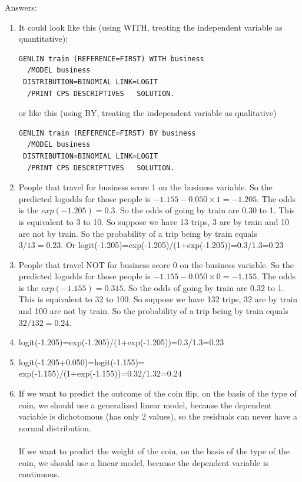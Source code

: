\documentclass[]{book}\usepackage[]{graphicx}\usepackage[]{color}
\begin{document}
Answers:
\begin{enumerate}


\item
It could look like this (using WITH, treating the independent variable as quantitative):

\begin{verbatim}
GENLIN train (REFERENCE=FIRST) WITH business
  /MODEL business
 DISTRIBUTION=BINOMIAL LINK=LOGIT
  /PRINT CPS DESCRIPTIVES   SOLUTION.
\end{verbatim}


or like this (using BY, treating the independent variable as qualitative)

\begin{verbatim}
GENLIN train (REFERENCE=FIRST) BY business
  /MODEL business
 DISTRIBUTION=BINOMIAL LINK=LOGIT
  /PRINT CPS DESCRIPTIVES   SOLUTION.
\end{verbatim}


\item
People that travel for business score 1 on the business variable. So the predicted logodds for those people is $-1.155 - 0.050 \times 1 = -1.205$. The odds is the $exp(-1.205)=0.3 $. So the odds of going by train are 0.30 to 1. This is equivalent to 3 to 10. So suppose we have 13 trips, 3 are by train and 10 are not by train. So the probability of a trip being by train equals $3/13=0.23$. Or logit(-1.205)=exp(-1.205)/(1+exp(-1.205))=0.3/1.3=0.23

\item
People that travel NOT for business score 0 on the business variable. So the predicted logodds for those people is $-1.155 - 0.050 \times 0 = -1.155$. The odds is the $exp(-1.155)=0.315 $. So the odds of going by train are 0.32 to 1. This is equivalent to 32 to 100. So suppose we have 132 trips, 32 are by train and 100 are not by train. So the probability of a trip being by train equals $32/132=0.24$.

\item

logit(-1.205)=exp(-1.205)/(1+exp(-1.205))=0.3/1.3=0.23


\item

logit(-1.205+0.050)=logit(-1.155)=
exp(-1.155)/(1+exp(-1.155))=0.32/1.32=0.24



\item


If we want to predict the outcome of the coin flip, on the basis of the type of coin, we should use a generalized linear model, because the dependent variable is dichotomous (has only 2 values), so the residuals can never have a normal distribution.
\\
\\
If we want to predict the weight of the coin, on the basis of the type of the coin, we should use a linear model, because the dependent variable is continuous.


\end{enumerate}
\end{document}

